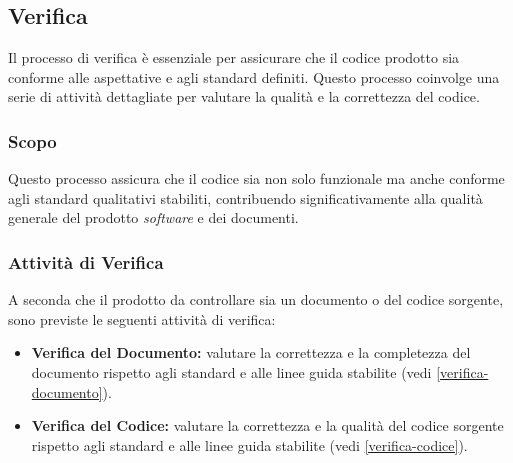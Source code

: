 \subsection{Verifica}

Il processo di verifica è essenziale per assicurare che il codice prodotto sia
conforme alle aspettative e agli standard definiti. Questo processo coinvolge
una serie di attività dettagliate per valutare la qualità e la correttezza del
codice.

\subsubsection{Scopo}
Questo processo assicura che il codice sia non solo funzionale ma anche
conforme agli standard qualitativi stabiliti, contribuendo significativamente
alla qualità generale del prodotto \textit{software} e dei documenti.

\subsubsection{Attività di Verifica}
A seconda che il prodotto da controllare sia un documento o del codice sorgente,
sono previste le seguenti attività di verifica:
\begin{itemize}
	\item \textbf{Verifica del Documento:} valutare la correttezza e la
	      completezza del documento rispetto agli standard e alle linee guida
	      stabilite (vedi \autoref{verifica-documento}).

	\item \textbf{Verifica del Codice:} valutare la correttezza e la qualità del
	      codice sorgente rispetto agli standard e alle linee guida stabilite
	      (vedi \autoref{verifica-codice}).
\end{itemize}
